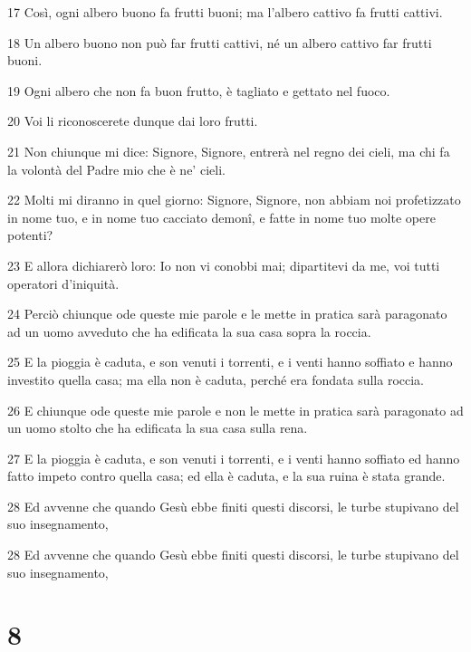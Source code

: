 \par 17 Così, ogni albero buono fa frutti buoni; ma l'albero cattivo fa frutti cattivi.
\par 18 Un albero buono non può far frutti cattivi, né un albero cattivo far frutti buoni.
\par 19 Ogni albero che non fa buon frutto, è tagliato e gettato nel fuoco.
\par 20 Voi li riconoscerete dunque dai loro frutti.
\par 21 Non chiunque mi dice: Signore, Signore, entrerà nel regno dei cieli, ma chi fa la volontà del Padre mio che è ne' cieli.
\par 22 Molti mi diranno in quel giorno: Signore, Signore, non abbiam noi profetizzato in nome tuo, e in nome tuo cacciato demonî, e fatte in nome tuo molte opere potenti?
\par 23 E allora dichiarerò loro: Io non vi conobbi mai; dipartitevi da me, voi tutti operatori d'iniquità.
\par 24 Perciò chiunque ode queste mie parole e le mette in pratica sarà paragonato ad un uomo avveduto che ha edificata la sua casa sopra la roccia.
\par 25 E la pioggia è caduta, e son venuti i torrenti, e i venti hanno soffiato e hanno investito quella casa; ma ella non è caduta, perché era fondata sulla roccia.
\par 26 E chiunque ode queste mie parole e non le mette in pratica sarà paragonato ad un uomo stolto che ha edificata la sua casa sulla rena.
\par 27 E la pioggia è caduta, e son venuti i torrenti, e i venti hanno soffiato ed hanno fatto impeto contro quella casa; ed ella è caduta, e la sua ruina è stata grande.
\par 28 Ed avvenne che quando Gesù ebbe finiti questi discorsi, le turbe stupivano del suo insegnamento,
\par 28 Ed avvenne che quando Gesù ebbe finiti questi discorsi, le turbe stupivano del suo insegnamento,

\chapter{8}

